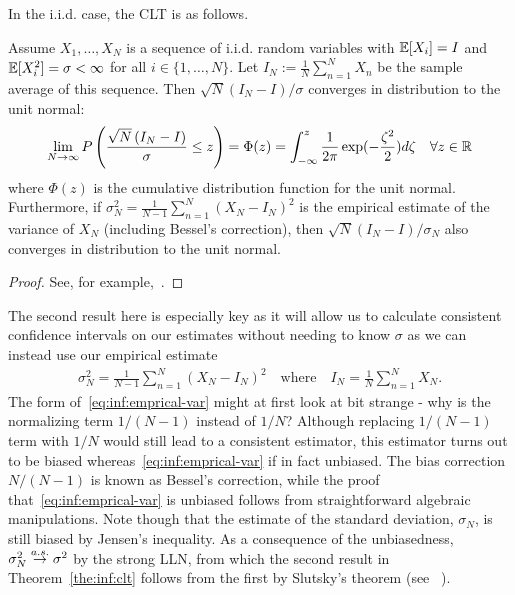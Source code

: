 In the i.i.d. case, the CLT is as follows.
\begin{theorem}
	\label{the:inf:clt}
Assume $X_1,\dots,X_N$ is a sequence of i.i.d. random variables with 
$\mathbb{E} [X_i] = I$ and $\mathbb{E}[X_i^2]=\sigma<\infty$ for all  $i \in \{1,\dots,N\}$. Let 
$I_N := \frac{1}{N} \sum_{n=1}^{N} X_n$ be the
sample average of this sequence.  Then $\sqrt{N}\left(I_N-I\right)/\sigma$ converges
in distribution to the unit normal:
\begin{align}
\lim\limits_{N\rightarrow\infty} P\left(\frac{\sqrt{N}\left(I_N-I\right)}{\sigma} \le z\right)
=\Phi(z)= \int_{-\infty}^{z} \frac{1}{2\pi} \exp(-\frac{\zeta^2}{2}) d\zeta \quad \forall z\in\mathbb{R}
\end{align}
where $\Phi(z)$ is the cumulative distribution function for the unit normal.
Furthermore, if $\sigma_N^2 = \frac{1}{N-1} \sum_{n=1}^{N} \left(X_N-I_N\right)^2$ is
the empirical estimate of the variance of $X_N$ (including Bessel's correction), then
$\sqrt{N}\left(I_N-I\right)/\sigma_N$ also converges
in distribution to the unit normal.
\end{theorem}
\begin{proof}
	See, for example,~\cite{durrett2010probability}.
\end{proof}
The second result here is especially key as it will allow us to calculate consistent confidence intervals
on our estimates without needing to know $\sigma$ as we can instead use our empirical estimate
\begin{align}
	\label{eq:inf:emprical-var}
	\sigma_N^2 = \frac{1}{N-1} \sum_{n=1}^{N} \left(X_N-I_N\right)^2 \quad \mathrm{where} 
	\quad I_N = \frac{1}{N}\sum_{n=1}^{N}X_N.
\end{align}
The form of~\eqref{eq:inf:emprical-var} might at first look at bit strange - why is the normalizing
term $1/(N-1)$ instead of $1/N$?  Although replacing $1/(N-1)$ term with $1/N$ would still lead
to a consistent estimator, this estimator turns out to be biased whereas~\eqref{eq:inf:emprical-var}
if in fact unbiased.  The bias correction $N/(N-1)$ is known as Bessel's correction, while the proof
that~\eqref{eq:inf:emprical-var} is unbiased follows from straightforward algebraic manipulations.
Note though that the estimate of the standard deviation, $\sigma_N$, is still biased by Jensen's
inequality.
As a consequence of the unbiasedness, $\sigma_N^2 \overset{a.s.}{\to} \sigma^2$ by the strong LLN, 
from which the second result
in Theorem~\ref{the:inf:clt} follows from the first by Slutsky's theorem (see ~\cite{durrett2010probability}).

